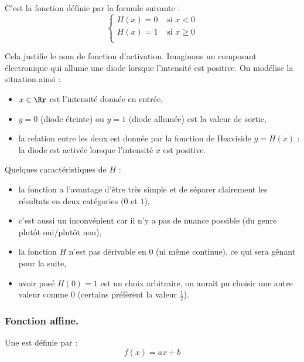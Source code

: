 \documentclass[11pt,class=report,crop=false]{standalone}
\begin{document}
C'est la fonction  définie par la formule suivante :
$$\begin{cases}
H(x) = 0 & \text{ si } x < 0 \\
H(x) = 1  & \text{ si } x \ge 0 \\
\end{cases}$$


Cela justifie le nom de fonction d'activation. Imaginons un composant électronique
qui allume une diode lorsque l'intensité est positive.
On modélise la situation ainsi :
\begin{itemize}
  \item $x\in\Rr$ est l'intensité donnée en entrée,
  \item $y=0$ (diode éteinte) ou $y=1$ (diode allumée) est la valeur de sortie,
  \item la relation entre les deux est donnée par la fonction de Heaviside $y=H(x)$ :
  la diode est activée lorsque l'intensité $x$ est positive.
\end{itemize}

\begin{remarque*}
Quelques caractéristiques de $H$ :
\begin{itemize}
  \item la fonction a l'avantage d'être très simple et de séparer clairement les résultats en deux catégories ($0$ et $1$),
  \item c'est aussi un inconvénient car il n'y a pas de nuance possible (du genre \og{}plutôt oui/plutôt non\fg{}),
  \item la fonction $H$ n'est pas dérivable en $0$ (ni même continue), ce qui sera gênant pour la suite,   
  \item avoir posé $H(0)=1$ est un choix arbitraire, on aurait pu choisir une autre valeur comme $0$ (certains préfèrent la valeur $\frac12$).
\end{itemize}
\end{remarque*}


\bigskip
\subsubsection{Fonction affine.}

Une  est définie par :
$$f(x) = ax + b$$

\end{document}
